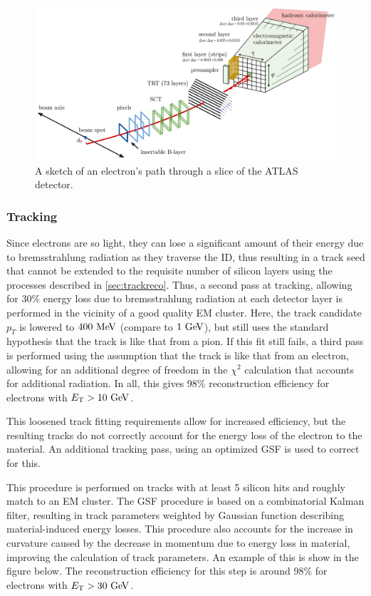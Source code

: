 \begin{figure}[htbp]
\centering
\includegraphics[width=.8\textwidth]{figures/EventReconstruction/electron-reco-sketch.png}
\caption{A sketch of an electron's path through a slice of the \ac{ATLAS} detector.}
\label{fig:elec_reco_sketch}
\end{figure}

\subsubsection{Tracking}
Since electrons are so light, they can lose a significant amount of their energy due to bremsstrahlung radiation as they traverse the \ac{ID}, thus resulting in a track seed that cannot be extended to the requisite number of silicon layers using the processes described in \autoref{sec:trackreco}. Thus, a second pass at tracking, allowing for 30\% energy loss due to bremsstrahlung radiation at each detector layer is performed in the vicinity of a good quality \ac{EM} cluster. Here, the track candidate $p_{T}$ is lowered to $400 \MeV$ (compare to $1 \GeV$), but still uses the standard hypothesis that the track is like that from a pion. If this fit still fails, a third pass is performed using the assumption that the track is like that from an electron, allowing for an additional degree of freedom in the $\chi^2$ calculation that accounts for additional radiation. In all, this gives 98\% reconstruction efficiency for electrons with $\et > 10 \GeV$. 

This loosened track fitting requirements allow for increased efficiency, but the resulting tracks do not correctly account for the energy loss of the electron to the material. An additional tracking pass, using an optimized \ac{GSF} is used to correct for this. 

This procedure is performed on tracks with at least 5 silicon hits and roughly match to an \ac{EM} cluster. The \ac{GSF} procedure is based on a combinatorial Kalman filter, resulting in track parameters weighted by Gaussian function describing material-induced energy losses. This procedure also accounts for the increase in curvature caused by the decrease in momentum due to energy loss in material, improving the calculation of track parameters. An example of this is show in the figure below. The reconstruction efficiency for this step is around 98\% for electrons with $\et > 30 \GeV$. 

